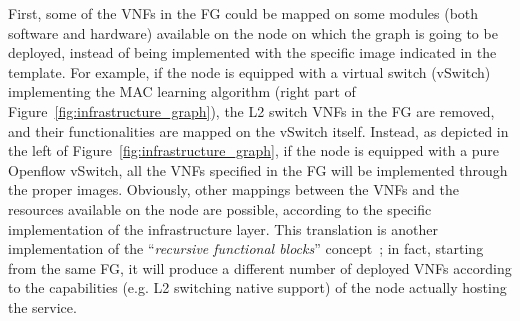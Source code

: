 First, some of the VNFs in the FG could be mapped on some modules (both software and hardware) available on the node on which the graph is going to be deployed, instead of being implemented with the specific image indicated in the template.
For example, if the node is equipped with a virtual switch (vSwitch) implementing the MAC learning algorithm (right part of Figure~\ref{fig:infrastructure_graph}), the L2 switch VNFs in the FG are removed, and their functionalities are mapped on the vSwitch itself.
Instead,  as depicted in the left of Figure~\ref{fig:infrastructure_graph}, if the node is equipped with a pure Openflow vSwitch, all the VNFs specified in the FG will be implemented through the proper images.
Obviously, other mappings between the VNFs and the resources available on the node are possible, according to the specific implementation of the infrastructure layer.
This translation is another implementation of the ``\textit{recursive functional blocks}'' concept~\cite{nfv}; in fact, starting from the same FG,  it will produce a different number of deployed VNFs according to the capabilities (e.g. L2 switching native support) of the node actually hosting the service.

